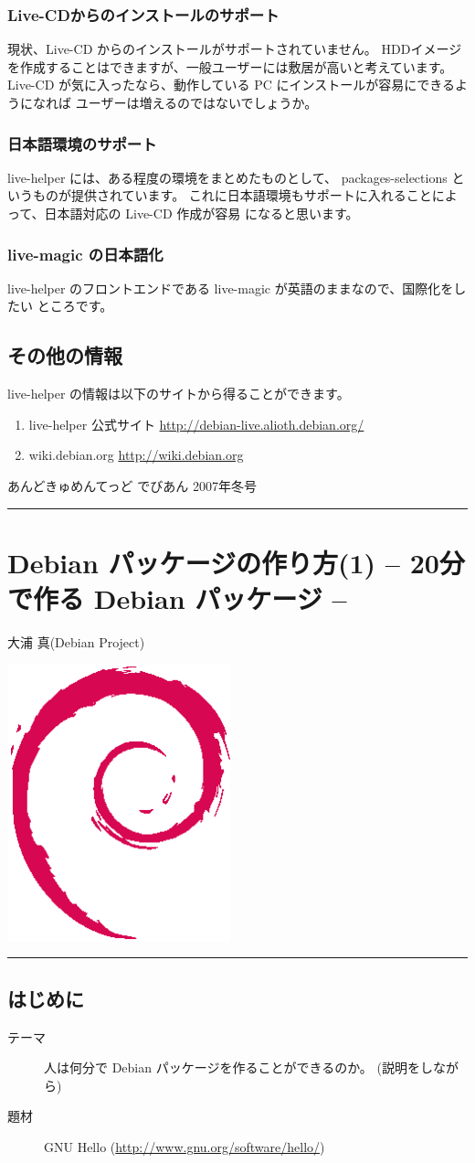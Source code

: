 \documentclass[mingoth,a4paper]{jsarticle}
\renewcommand{\dancersection}[2]{%
\newpage
あんどきゅめんてっど でびあん 2007年冬号
%
\vspace{0.1mm}\\
{\color{dancerlightblue}\rule{\hsize}{2mm}}

%
%
\begin{minipage}[t]{0.7\hsize}
\color{dancerdarkblue}
\vspace{1cm}
\section{#1}
\hfill{}#2\\
\end{minipage}
\begin{minipage}[t]{0.3\hsize}
\vspace{-2cm}
\hfill{}\includegraphics[height=8cm]{image200502/openlogo-nd.eps}\\
\vspace{-5cm}
\end{minipage}
%
%
{\color{dancerdarkblue}\rule{0.74\hsize}{2mm}}
%
\vspace{2cm}
}
\begin{document}
\subsubsection{Live-CDからのインストールのサポート}
現状、Live-CD からのインストールがサポートされていません。
HDDイメージを作成することはできますが、一般ユーザーには敷居が高いと考えています。
Live-CD が気に入ったなら、動作している PC にインストールが容易にできるようになれば
ユーザーは増えるのではないでしょうか。

\subsubsection{日本語環境のサポート}
live-helper には、ある程度の環境をまとめたものとして、
packages-selections というものが提供されています。
これに日本語環境もサポートに入れることによって、日本語対応の Live-CD 作成が容易
になると思います。

\subsubsection{live-magic の日本語化}
live-helper のフロントエンドである live-magic が英語のままなので、国際化をしたい
ところです。


\subsection{その他の情報}
live-helper の情報は以下のサイトから得ることができます。
\begin{enumerate}
\item live-helper 公式サイト \url{http://debian-live.alioth.debian.org/}
\item wiki.debian.org \url{http://wiki.debian.org}

\end{enumerate}

\dancersection{Debian パッケージの作り方(1) -- 20分で作る Debian パッケージ --}{大浦 真(Debian Project)}

\subsection{はじめに}
\begin{description}
\item[テーマ] 人は何分で Debian パッケージを作ることができるのか。
  (説明をしながら)
\item[題材] GNU Hello (\url{http://www.gnu.org/software/hello/})
\end{description}
\end{document}
